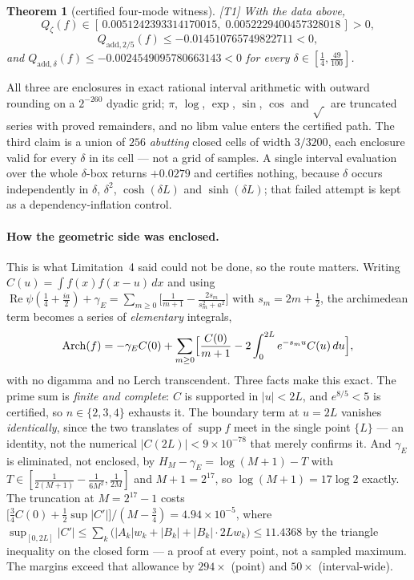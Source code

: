 \documentclass[11pt,a4paper]{article}
\newtheorem{theorem}{Theorem}
\theoremstyle{definition}
\theoremstyle{remark}
\newcommand{\tier}[1]{{\small\textsf{[#1]}}}
\begin{document}
\begin{theorem}[certified four-mode witness]\label{thm:certwitness}\tier{T1}
With the data above,
\[
  Q_\zeta(f)\in[\,0.0051242393314170015,\;0.0052229400457328018\,]>0,
\]
\[
  Q_{\mathrm{add},2/5}(f)\le-0.014510765749822711<0,
\]
and $Q_{\mathrm{add},\delta}(f)\le-0.0024549095780663143<0$ for \emph{every}
$\delta\in[\tfrac14,\tfrac{49}{100}]$.
\end{theorem}

All three are enclosures in exact rational interval arithmetic with outward rounding on a
$2^{-260}$ dyadic grid; $\pi$, $\log$, $\exp$, $\sin$, $\cos$ and $\sqrt{\ }$ are truncated
series with proved remainders, and no libm value enters the certified path. The third claim
is a union of $256$ \emph{abutting} closed cells of width $3/3200$, each enclosure valid for
every $\delta$ in its cell --- not a grid of samples. A single interval evaluation over the
whole $\delta$-box returns $+0.0279$ and certifies nothing, because $\delta$ occurs
independently in $\delta$, $\delta^{2}$, $\cosh(\delta L)$ and $\sinh(\delta L)$; that failed
attempt is kept as a dependency-inflation control.

\paragraph{How the geometric side was enclosed.} This is what Limitation~4 said could not be
done, so the route matters. Writing $C(u)=\int f(x)f(x-u)\,dx$ and using
$\operatorname{Re}\psi(\tfrac14+\tfrac{ia}{2})+\gamma_E
=\sum_{m\ge0}\bigl[\tfrac1{m+1}-\tfrac{2s_m}{s_m^{2}+a^{2}}\bigr]$ with $s_m=2m+\tfrac12$,
the archimedean term becomes a series of \emph{elementary} integrals,
\[
  \mathrm{Arch}(f)=-\gamma_EC(0)+\sum_{m\ge0}\Bigl[\frac{C(0)}{m+1}
  -2\int_0^{2L}e^{-s_mu}C(u)\,du\Bigr],
\]
with no digamma and no Lerch transcendent. Three facts make this exact. The prime sum is
\emph{finite and complete}: $C$ is supported in $|u|<2L$, and $e^{8/5}<5$ is certified, so
$n\in\{2,3,4\}$ exhausts it. The boundary term at $u=2L$ vanishes \emph{identically}, since
the two translates of $\operatorname{supp}f$ meet in the single point $\{L\}$ --- an
identity, not the numerical $|C(2L)|<9\times10^{-78}$ that merely confirms it. And
$\gamma_E$ is eliminated, not enclosed, by $H_M-\gamma_E=\log(M+1)-T$ with
$T\in[\tfrac1{2(M+1)}-\tfrac1{6M^{2}},\tfrac1{2M}]$ and $M+1=2^{17}$, so $\log(M+1)=17\log2$
exactly. The truncation at $M=2^{17}-1$ costs
$\bigl[\tfrac34C(0)+\tfrac12\sup|C'|\bigr]/(M-\tfrac34)=4.94\times10^{-5}$, where
$\sup_{[0,2L]}|C'|\le\sum_k\bigl(|A_k|w_k+|B_k|+|B_k|\cdot2Lw_k\bigr)\le11.4368$ by the
triangle inequality on the closed form --- a proof at every point, not a sampled maximum.
The margins exceed that allowance by $294\times$ (point) and $50\times$ (interval-wide).
\end{document}
